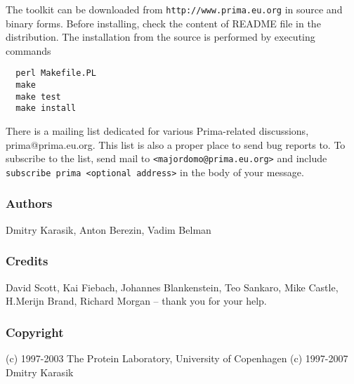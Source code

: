 \documentclass{report}
\begin{document}
The toolkit can be downloaded from \texttt{http://www.prima.eu.org} in
source and binary forms. Before installing, check the content of README file
in the distribution. The installation from the source is performed by
executing commands
\begin{verbatim}
  perl Makefile.PL
  make
  make test
  make install
\end{verbatim}

There is a mailing list dedicated for various Prima-related discussions, 
prima@prima.eu.org. This list is also a proper place to send bug reports to. 
To subscribe to the list, send mail to \texttt{<majordomo@prima.eu.org>} and 
include \texttt{subscribe prima <optional address>} in the body of your message.

\subsubsection{Authors}

Dmitry Karasik,
Anton Berezin,
Vadim Belman

\subsubsection{Credits}

David Scott,
Kai Fiebach,
Johannes Blankenstein,
Teo Sankaro,
Mike Castle,
H.Merijn Brand,
Richard Morgan
-- thank you for your help.

\subsubsection{Copyright}

(c) 1997-2003 The Protein Laboratory, University of Copenhagen
(c) 1997-2007 Dmitry Karasik
\end{document}
